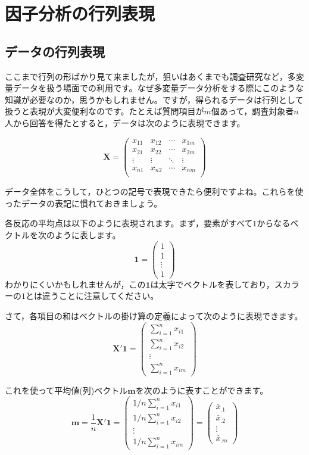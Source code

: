 \documentclass{ltjsbook}
\begin{document}
\chapter{因子分析の行列表現}
\label{H05_MatrixForm}
\section{データの行列表現}

ここまで行列の形ばかり見て来ましたが，狙いはあくまでも調査研究など，多変量データを扱う場面での利用です。なぜ多変量データ分析をする際にこのような知識が必要なのか，思うかもしれません。ですが，得られるデータは行列として扱うと表現が大変便利なのです。たとえば質問項目が$m$個あって，調査対象者$n$人から回答を得たとすると，データは次のように表現できます。

\[
    \bm{X}=
    \begin{pmatrix}
        x_{11} & x_{12} & \cdots & x_{1m} \\
        x_{21} & x_{22} & \cdots & x_{2m} \\
        \vdots & \vdots & \ddots & \vdots \\
        x_{n1} & x_{n2} & \cdots & x_{nm} \\
    \end{pmatrix}
\]

データ全体をこうして，ひとつの記号で表現できたら便利ですよね。これらを使ったデータの表記に慣れておきましょう。

各反応の平均点は以下のように表現されます。まず，要素がすべて$1$からなるベクトルを次のように表します。
\[ \bm{1}=\begin{pmatrix} 1 \\ 1 \\ \vdots \\1 \end{pmatrix} \]
わかりにくいかもしれませんが，この$\bm{1}$は太字でベクトルを表しており，スカラーの$1$とは違うことに注意してください。

さて，各項目の和はベクトルの掛け算の定義によって次のように表現できます。
\[ \bm{X}' \bm{1} = \begin{pmatrix} \sum_{i=1}^{n} x_{i1} \\ \sum_{i=1}^{n} x_{i2} \\ \vdots \\ \sum_{i=1}^{n} x_{im} \end{pmatrix} \]


これを使って平均値(列)ベクトル$\bm{m}$を次のように表すことができます。
\[ \bm{m} = \frac{1}{n} \bm{X}' \bm{1} =
    \begin{pmatrix} 1/n\sum_{i=1}^{n} x_{i1} \\ 1/n\sum_{i=1}^{n} x_{i2} \\ \vdots \\ 1/n\sum_{i=1}^{n} x_{im} \end{pmatrix} =
    \begin{pmatrix}\bar{x}_{.1} \\ \bar{x}_{.2}\\ \vdots \\\bar{x}_{.m} \end{pmatrix} \]
\end{document}
